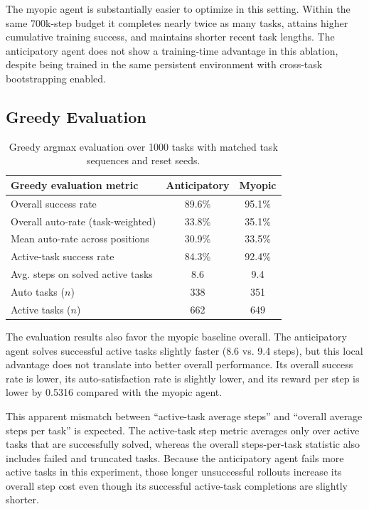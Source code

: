 \documentclass[10pt]{article} %
\begin{document}
The myopic agent is substantially easier to optimize in this setting. Within the same 700k-step budget it completes nearly twice as many tasks, attains higher cumulative training success, and maintains shorter recent task lengths. The anticipatory agent does not show a training-time advantage in this ablation, despite being trained in the same persistent environment with cross-task bootstrapping enabled.

\subsection{Greedy Evaluation}

\begin{table}[t]
    \centering
    \begin{tabular}{lcc}
        \hline
        Greedy evaluation metric & Anticipatory & Myopic \\
        \hline
        Overall success rate & 89.6\% & 95.1\% \\
        Overall auto-rate (task-weighted) & 33.8\% & 35.1\% \\
        Mean auto-rate across positions & 30.9\% & 33.5\% \\
        Active-task success rate & 84.3\% & 92.4\% \\
        Avg. steps on solved active tasks & 8.6 & 9.4 \\
        Auto tasks ($n$) & 338 & 351 \\
        Active tasks ($n$) & 662 & 649 \\
        \hline
    \end{tabular}
    \caption{Greedy argmax evaluation over 1000 tasks with matched task sequences and reset seeds.}
    \label{tab:eval-results-current}
\end{table}

The evaluation results also favor the myopic baseline overall. The anticipatory agent solves successful active tasks slightly faster (8.6 vs. 9.4 steps), but this local advantage does not translate into better overall performance. Its overall success rate is lower, its auto-satisfaction rate is slightly lower, and its reward per step is lower by 0.5316 compared with the myopic agent.

This apparent mismatch between ``active-task average steps'' and ``overall average steps per task'' is expected. The active-task step metric averages only over active tasks that are successfully solved, whereas the overall steps-per-task statistic also includes failed and truncated tasks. Because the anticipatory agent fails more active tasks in this experiment, those longer unsuccessful rollouts increase its overall step cost even though its successful active-task completions are slightly shorter.
\end{document}
